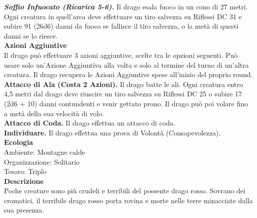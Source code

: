\begin{multicols}{2}
\emph{\textbf{Soffio Infuocato (Ricarica 5-6).}} Il drago esala fuoco in un cono di 27 metri. Ogni creatura in quell'area deve effettuare un tiro salvezza su Riflessi DC  31 e subire 91 (26d6) danni da fuoco se fallisce il tiro salvezza, o la metà di questi danni se lo riesce.\\
\textbf{Azioni Aggiuntive}\\
Il drago può effettuare 3 azioni aggiuntive, scelte tra le opzioni seguenti. Può usare solo un'Azione Aggiuntiva alla volta e solo al termine del turno di un'altra creatura. Il drago recupera le Azioni Aggiuntive spese all'inizio del proprio round.\\
\textbf{Attacco di Ala (Costa 2 Azioni).} Il drago batte le ali. Ogni creatura entro 4,5 metri dal  drago deve riuscire un tiro salvezza su Riflessi DC 25 o subire 17 (2d6 + 10) danni contundenti e venir gettato prono. Il drago può poi volare fino a metà della sua velocità di volo.\\
\textbf{Attacco di Coda.} Il drago effettua un attacco di coda.\\
\textbf{Individuare.} Il drago effettua una prova di Volontà (Consapevolezza).\\	
\textbf{Ecologia}\\
Ambiente: Montagne calde\\
Organizzazione: Solitario\\
Tesoro: Triplo\\
\textbf{Descrizione}\\
Poche creature sono più crudeli e terribili del possente drago rosso. Sovrano dei cromatici, il terribile drago rosso porta rovina e morte nelle terre minacciate dalla sua presenza.\\


\end{multicols}
